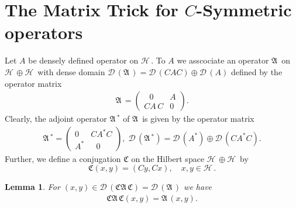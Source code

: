 \documentclass[12pt]{amsart}
\newtheorem{lem}[thm]{Lemma}
\theoremstyle{definition}
\newcommand{\gA}{\mathfrak{A}\,}
\newcommand{\cD}{\mathcal{D}\,}
\newcommand{\cH}{\mathcal{H}\,}
\newcommand{\gC}{\mathfrak{C}}
\begin{document}
\section{The Matrix Trick for $C$-Symmetric operators}

Let $A$ be densely defined operator on  $\cH$. To $A$ we asscociate
an operator $\gA$  on $\cH\oplus\cH$ with dense domain $\cD(\gA)=\cD(CAC)\oplus \cD(A)$ defined by the operator matrix
\begin{gather}\label{matrixtbt1}
\gA=\left(
\begin{array}{ll}
~~~ 0 & A \\
CA\,C & 0
\end{array}\right).
\end{gather}
Clearly, the adjoint operator $\gA^*$ of $\gA$ is given by the operator matrix
\begin{gather}\label{matrixtbt2}
\gA^*=\left(
\begin{array}{ll}
 0 & CA^*C \\
A^* & ~~~ 0
\end{array}\right),\; \cD(\gA^*)=\cD(A^*)\oplus\cD(CA^*C).
\end{gather}
Further, we define a conjugation $\gC$ on the Hilbert space $\cH\oplus\cH$ by
\begin{equation}\label{newcon}
\gC(x,y)=(Cy,Cx), \quad x,y\in \cH.
\end{equation}
\begin{lem}\label{gAsymmetric} For $(x,y)\in \cD(\gC\gA\gC)=\cD( \gA)$ we have
\begin{align*}%
\gC\gA\gC(x,y)= \gA(x,y).
\end{align*}
\end{lem}
\end{document}
